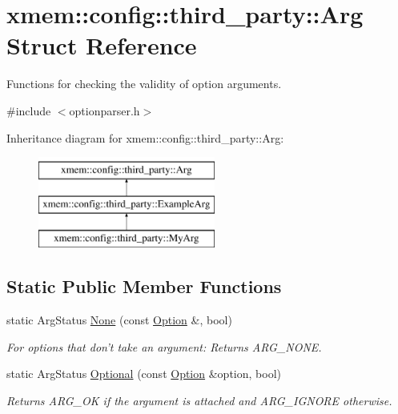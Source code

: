 \hypertarget{structxmem_1_1config_1_1third__party_1_1_arg}{\section{xmem\-:\-:config\-:\-:third\-\_\-party\-:\-:Arg Struct Reference}
\label{structxmem_1_1config_1_1third__party_1_1_arg}
}


Functions for checking the validity of option arguments.  




{\ttfamily \#include $<$optionparser.\-h$>$}

Inheritance diagram for xmem\-:\-:config\-:\-:third\-\_\-party\-:\-:Arg\-:\begin{figure}[H]
\begin{center}
\leavevmode
\includegraphics[height=3.000000cm]{structxmem_1_1config_1_1third__party_1_1_arg}
\end{center}
\end{figure}
\subsection*{Static Public Member Functions}
\begin{DoxyCompactItemize}
\item 
\hypertarget{structxmem_1_1config_1_1third__party_1_1_arg_afdfd4a0adea72c759ec04bf5feaf3ec0}{static Arg\-Status \hyperlink{structxmem_1_1config_1_1third__party_1_1_arg_afdfd4a0adea72c759ec04bf5feaf3ec0}{None} (const \hyperlink{classxmem_1_1config_1_1third__party_1_1_option}{Option} \&, bool)}\label{structxmem_1_1config_1_1third__party_1_1_arg_afdfd4a0adea72c759ec04bf5feaf3ec0}

\begin{DoxyCompactList}\small\item\em For options that don't take an argument\-: Returns A\-R\-G\-\_\-\-N\-O\-N\-E. \end{DoxyCompactList}\item 
\hypertarget{structxmem_1_1config_1_1third__party_1_1_arg_a842eb05bf9c4581b082613f044691d89}{static Arg\-Status \hyperlink{structxmem_1_1config_1_1third__party_1_1_arg_a842eb05bf9c4581b082613f044691d89}{Optional} (const \hyperlink{classxmem_1_1config_1_1third__party_1_1_option}{Option} \&option, bool)}\label{structxmem_1_1config_1_1third__party_1_1_arg_a842eb05bf9c4581b082613f044691d89}

\begin{DoxyCompactList}\small\item\em Returns A\-R\-G\-\_\-\-O\-K if the argument is attached and A\-R\-G\-\_\-\-I\-G\-N\-O\-R\-E otherwise. \end{DoxyCompactList}\end{DoxyCompactItemize}


